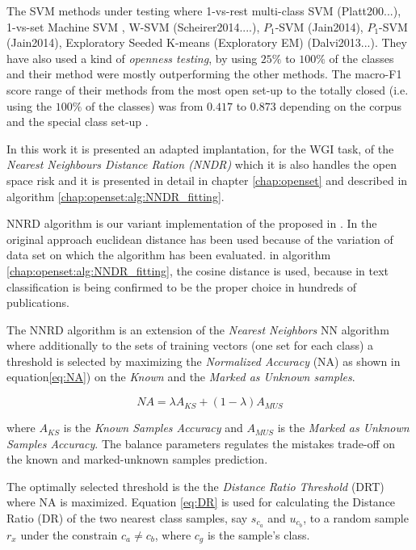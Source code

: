 The SVM methods under testing where 1-vs-rest multi-class SVM (Platt200...), 1-vs-set Machine SVM \parencite{scheirer2013toward}, W-SVM (Scheirer2014....), $P_{1}$-SVM (Jain2014), $P_{1}$-SVM (Jain2014), Exploratory Seeded K-means (Exploratory EM) (Dalvi2013...). They have also used a kind of \textit{openness testing}, by using $25\%$ to $100\%$ of the classes and their method were mostly outperforming the other methods. The macro-F1 score range of their methods from the most open set-up to the totally closed (i.e. using the $100\%$ of the classes) was from $0.417$ to $0.873$ depending on the corpus and the special class set-up \parencite{fei2016breaking}.

In this work it is presented an adapted implantation, for the WGI task, of the \textit{Nearest Neighbours Distance Ration (NNDR)} which it is also handles the open space risk and it is presented in detail in chapter \ref{chap:openset} and described in algorithm \ref{chap:openset:alg:NNDR_fitting}.

NNRD algorithm is our variant implementation of the proposed in \parencite{mendesjunior2016}. In the original approach euclidean distance has been used because of the variation of data set on which the algorithm has been evaluated. in algorithm \ref{chap:openset:alg:NNDR_fitting}, the cosine distance is used, because in text classification is being confirmed to be the proper choice in hundreds of publications. 

The NNRD algorithm is an extension of the \textit{Nearest Neighbors} NN algorithm where additionally to the sets of training vectors (one set for each class) a threshold is selected by maximizing the \textit{Normalized Accuracy} (NA) as shown in equation\ref{eq:NA}) on the \textit{Known} and the \textit{Marked as Unknown samples}.

\begin{equation} \label{eq:NA}
    NA = \lambda A_{KS} + (1 - \lambda) A_{MUS}
\end{equation}

\noindent
where $A_{KS}$ is the \textit{Known Samples Accuracy} and $A_{MUS}$ is the \textit{Marked as Unknown Samples Accuracy}. The balance parameters \lambda regulates the mistakes trade-off on the known and marked-unknown samples prediction.

The optimally selected threshold is the the \textit{Distance Ratio Threshold} (DRT) where NA is maximized. Equation \ref{eq:DR} is used for calculating the Distance Ratio (DR) of the two nearest class samples, say $s_{c_{a}}$ and $u_{c_{b}}$, to a random sample $r_{x}$ under the constrain $c_{a} \neq c_{b}$, where $c_{g}$ is the sample's class.


